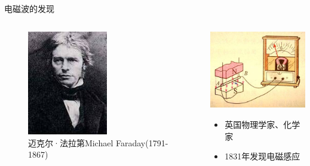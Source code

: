 \documentclass{ctexbeamer}
\begin{document}
\begin{frame}{电磁波的发现}
  \begin{columns}
    \begin{column}{0.35\linewidth}
    \begin{figure}
      \includegraphics[width=3.5cm]{faraday.jpg}
      \caption{迈克尔·法拉第Michael Faraday(1791-1867)}
    \end{figure}
    \end{column}
    \hfill
    \begin{column}{0.65\linewidth}
      \includegraphics[width=4.5cm]{faradayexperiment.jpg}
      \begin{itemize}
        \item 英国物理学家、化学家
        \item 1831年发现电磁感应
      \end{itemize}
    \end{column}
  \end{columns}
\end{frame}
\end{document}
